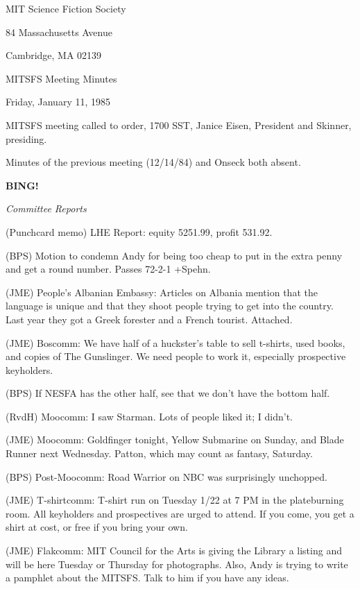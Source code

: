 \documentclass[12pt]{article}
\newcommand{\bing}{{\bf BING!} }
\newcommand{\goto}[1]{\bing \vskip 12pt \centerline{{\em{#1}}}}
\begin{document}
\begin{center}

MIT Science Fiction Society 

84 Massachusetts Avenue

Cambridge, MA 02139

\vspace{12pt}

MITSFS Meeting Minutes 

Friday, January 11, 1985

\end{center}
 
\vspace{18pt}

\setlength{\parskip}{6pt}

\noindent
MITSFS meeting called to order, 1700 SST,
Janice Eisen, President and Skinner, presiding.

Minutes of the previous meeting (12/14/84) and Onseck both absent.

\goto{Committee Reports}

(Punchcard memo) LHE Report: equity 5251.99, profit 531.92.

(BPS) Motion to condemn Andy for being too cheap to put in the extra penny and get a round number. Passes 72-2-1 +Spehn.

(JME) People's Albanian Embassy: Articles on Albania mention that the language is unique and that they shoot people trying to get into the country. Last year they got a Greek forester and a French tourist. Attached.

(JME) Boscomm: We have half of a huckster's table to sell t-shirts, used books, and copies of The Gunslinger. We need people to work it, especially prospective keyholders.

(BPS) If NESFA has the other half, see that we don't have the bottom half.

(RvdH) Moocomm: I saw Starman. Lots of people liked it; I didn't.

(JME) Moocomm: Goldfinger tonight, Yellow Submarine on Sunday, and Blade Runner next Wednesday. Patton, which may count as fantasy, Saturday.

(BPS) Post-Moocomm: Road Warrior on NBC was surprisingly unchopped.

(JME) T-shirtcomm: T-shirt run on Tuesday 1/22 at 7 PM in the plateburning room. All keyholders and prospectives are urged to attend. If you come, you get a shirt at cost, or free if you bring your own.

(JME) Flakcomm: MIT Council for the Arts is giving the Library a listing and will be here Tuesday or Thursday for photographs. Also, Andy is trying to write a pamphlet about the MITSFS. Talk to him if you have any ideas.
\end{document}
